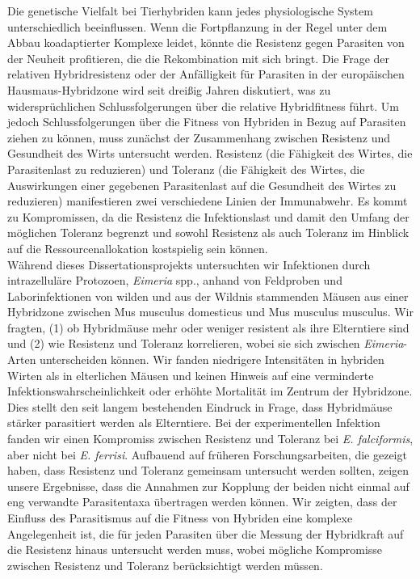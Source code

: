 Die genetische Vielfalt bei Tierhybriden kann jedes physiologische System unterschiedlich beeinflussen. Wenn die Fortpflanzung in der Regel unter dem Abbau koadaptierter Komplexe leidet, könnte die Resistenz gegen Parasiten von der Neuheit profitieren, die die Rekombination mit sich bringt. Die Frage der relativen Hybridresistenz oder der Anfälligkeit für Parasiten in der europäischen Hausmaus-Hybridzone wird seit dreißig Jahren diskutiert, was zu widersprüchlichen Schlussfolgerungen über die relative Hybridfitness führt. Um jedoch Schlussfolgerungen über die Fitness von Hybriden in Bezug auf Parasiten ziehen zu können, muss zunächst der Zusammenhang zwischen Resistenz und Gesundheit des Wirts untersucht werden. Resistenz (die Fähigkeit des Wirtes, die Parasitenlast zu reduzieren) und Toleranz (die Fähigkeit des Wirtes, die Auswirkungen einer gegebenen Parasitenlast auf die Gesundheit des Wirtes zu reduzieren) manifestieren zwei verschiedene Linien der Immunabwehr. Es kommt zu Kompromissen, da die Resistenz die Infektionslast und damit den Umfang der möglichen Toleranz begrenzt und sowohl Resistenz als auch Toleranz im Hinblick auf die Ressourcenallokation kostspielig sein können. \\
Während dieses Dissertationsprojekts untersuchten wir Infektionen durch intrazelluläre Protozoen, \textit{Eimeria} spp., anhand von Feldproben und Laborinfektionen von wilden und aus der Wildnis stammenden Mäusen aus einer Hybridzone zwischen Mus musculus domesticus und Mus musculus musculus. Wir fragten, (1) ob Hybridmäuse mehr oder weniger resistent als ihre Elterntiere sind und (2) wie Resistenz und Toleranz korrelieren, wobei sie sich zwischen \textit{Eimeria}-Arten unterscheiden können. Wir fanden niedrigere Intensitäten in hybriden Wirten als in elterlichen Mäusen und keinen Hinweis auf eine verminderte Infektionswahrscheinlichkeit oder erhöhte Mortalität im Zentrum der Hybridzone. Dies stellt den seit langem bestehenden Eindruck in Frage, dass Hybridmäuse stärker parasitiert werden als Elterntiere. Bei der experimentellen Infektion fanden wir einen Kompromiss zwischen Resistenz und Toleranz bei \textit{E. falciformis}, aber nicht bei \textit{E. ferrisi}. Aufbauend auf früheren Forschungsarbeiten, die gezeigt haben, dass Resistenz und Toleranz gemeinsam untersucht werden sollten, zeigen unsere Ergebnisse, dass die Annahmen zur Kopplung der beiden nicht einmal auf eng verwandte Parasitentaxa übertragen werden können. Wir zeigten, dass der Einfluss des Parasitismus auf die Fitness von Hybriden eine komplexe Angelegenheit ist, die für jeden Parasiten über die Messung der Hybridkraft auf die Resistenz hinaus untersucht werden muss, wobei mögliche Kompromisse zwischen Resistenz und Toleranz berücksichtigt werden müssen.
